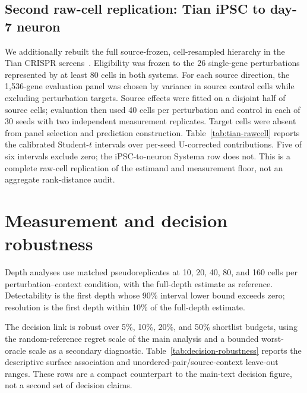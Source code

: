 \documentclass{article}
\begin{document}


\subsection{Second raw-cell replication: Tian iPSC to day-7 neuron}

We additionally rebuilt the full source-frozen, cell-resampled hierarchy in
the Tian CRISPR screens~\citep{tian2019crispri}. Eligibility was frozen to the 26 single-gene
perturbations represented by at least 80 cells in both systems. For each
source direction, the 1,536-gene evaluation panel was chosen by variance in
source control cells while excluding perturbation targets. Source effects
were fitted on a disjoint half of source cells; evaluation then used 40 cells
per perturbation and control in each of 30 seeds with two independent
measurement replicates. Target cells were absent from panel selection and
prediction construction. Table~\ref{tab:tian-rawcell} reports the calibrated
Student-$t$ intervals over per-seed U-corrected contributions. Five of six
intervals exclude zero; the iPSC-to-neuron Systema row does not. This is a
complete raw-cell replication of the estimand and measurement floor, not an
aggregate rank-distance audit.



\section{Measurement and decision robustness}
\label{app:robustness}

Depth analyses use matched pseudoreplicates at 10, 20, 40, 80, and 160 cells per perturbation--context condition, with the full-depth estimate as reference. Detectability is the first depth whose 90\% interval lower bound exceeds zero; resolution is the first depth within 10\% of the full-depth estimate.

The decision link is robust over 5\%, 10\%, 20\%, and 50\% shortlist budgets, using the random-reference regret scale of the main analysis and a bounded worst-oracle scale as a secondary diagnostic. Table~\ref{tab:decision-robustness} reports the descriptive surface association and unordered-pair/source-context leave-out ranges. These rows are a compact counterpart to the main-text decision figure, not a second set of decision claims.


\end{document}

